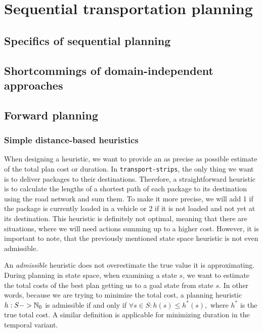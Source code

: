 \chapter{Sequential transportation planning}

\section{Specifics of sequential planning}


\section{Shortcommings of domain-independent approaches}


\section{Forward planning}




\subsection{Simple distance-based heuristics}

When designing a heuristic, we want to provide an as precise as possible estimate
of the total plan cost or duration.
In \texttt{transport-strips}, the only thing we want is to deliver packages to their destinations. Therefore, a straightforward heuristic is to calculate the lengths of a shortest
path of each package to its destination using the road network and sum them.
To make it more precise, we will add 1 if the package is currently loaded
in a vehicle or 2 if it is not loaded and not yet at its destination.
This heuristic is definitely not optimal, meaning that there are situations,
where we will need actions summing up to a higher cost.
However, it is important to note, that the previously mentioned state space heuristic 
is not even admissible.

An \textit{admissible} heuristic does not overestimate
the true value it is approximating. During planning in state space,
when examining a state $s$, we want to estimate the total costs of the best
plan getting us to a goal state from state $s$. In other words, because we are
trying to minimize the total cost,
a planning heuristic $h: S -> \mathbb{N}_0$ is admissible if and only if $\forall s \in S : h(s) \leq h^*(s),$
where $h^*$ is the true total cost. A similar definition is applicable for minimizing duration in the temporal variant.

